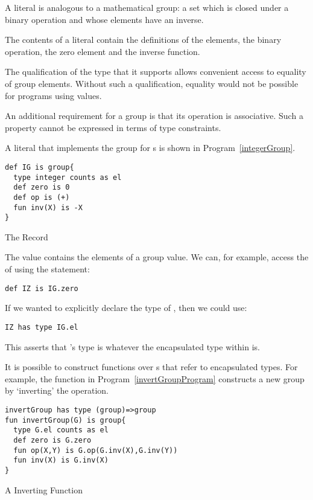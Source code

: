 \begin{aside}
A  literal is analogous to a mathematical group: a set which is closed under a binary operation and whose elements have an inverse.

The contents of a  literal contain the definitions of the elements, the binary operation, the zero element and the inverse function.
\end{aside}
\begin{aside}
The qualification of the  type that it supports  allows convenient access to equality of group elements. Without such a qualification, equality would not be possible for programs using  values.
\end{aside}

\begin{aside}
An additional requirement for a group is that its operation is associative. Such a property cannot be expressed in terms of type constraints.
\end{aside}

A  literal that implements the group for s is shown in Program~\vref{integerGroup}.
\begin{program}
\begin{lstlisting}
def IG is group{
  type integer counts as el
  def zero is 0
  def op is (+)
  fun inv(X) is -X
}
\end{lstlisting}
\caption{The   Record}
\label{integerGroup}
\end{program}
The  value contains the elements of a group value. We can, for example, access the  of  using the statement:
\begin{lstlisting}
def IZ is IG.zero
\end{lstlisting}
If we wanted to explicitly declare the type of , then we could use:
\begin{lstlisting}
IZ has type IG.el
\end{lstlisting}
This asserts that 's type is whatever the encapsulated type within  is.

It is possible to construct functions over s that refer to encapsulated types. For example, the  function in Program~\vref{invertGroupProgram} constructs a new group by `inverting' the operation.

\begin{program}
\begin{lstlisting}
invertGroup has type (group)=>group
fun invertGroup(G) is group{
  type G.el counts as el
  def zero is G.zero
  fun op(X,Y) is G.op(G.inv(X),G.inv(Y))
  fun inv(X) is G.inv(X)
}
\end{lstlisting}
\caption{A  Inverting Function}
\label{invertGroupProgram}
\end{program}

